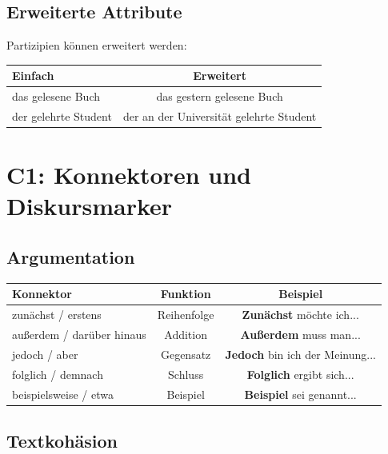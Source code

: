 \section{Erweiterte Attribute}
\label{sec:C1Erweitert}

Partizipien können erweitert werden:

\begin{center}
\begin{tabular}{|l|c|}
\hline
Einfach & Erweitert \\ \hline
das gelesene Buch & das gestern gelesene Buch \\ \hline
der gelehrte Student & der an der Universität gelehrte Student \\ \hline
\end{tabular}
\end{center}

\chapterend

\chapter{C1: Konnektoren und Diskursmarker}
\label{cha:C1Konnektoren}

\section{Argumentation}
\label{sec:C1Argumentation}

\begin{center}
\begin{tabular}{|l|c|c|}
\hline
Konnektor & Funktion & Beispiel \\ \hline
zunächst / erstens & Reihenfolge & \textbf{Zunächst} möchte ich... \\ \hline
außerdem / darüber hinaus & Addition & \textbf{ Außerdem} muss man... \\ \hline
jedoch / aber & Gegensatz & \textbf{Jedoch} bin ich der Meinung... \\ \hline
folglich / demnach & Schluss & \textbf{Folglich} ergibt sich... \\ \hline
beispielsweise / etwa & Beispiel & \textbf{Beispiel} sei genannt... \\ \hline
\end{tabular}
\end{center}

\section{Textkohäsion}
\label{sec:C1Textkohaesion}

